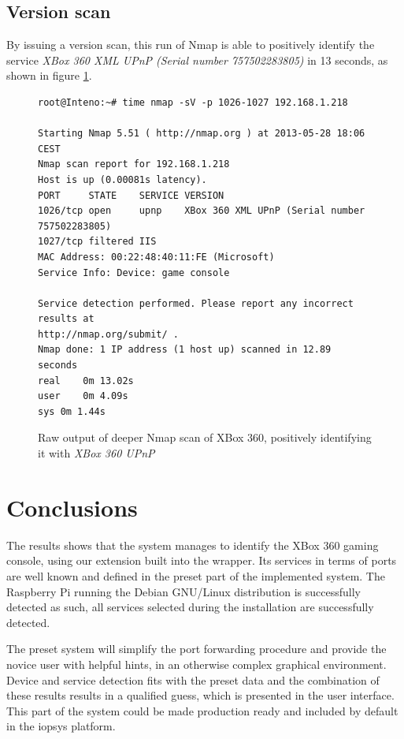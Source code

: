 \documentclass[a4paper,11pt]{kth-bcs}
\begin{document}
\section{Version scan}
By issuing a version scan, this run of Nmap is able to positively identify the service \emph{XBox 360 XML UPnP (Serial number 757502283805)} in 13 seconds, as shown in figure \ref{fig:nmapxbox}.
   \begin{figure}[ht]
      \centering
      \begin{verbatim}
root@Inteno:~# time nmap -sV -p 1026-1027 192.168.1.218

Starting Nmap 5.51 ( http://nmap.org ) at 2013-05-28 18:06 CEST
Nmap scan report for 192.168.1.218
Host is up (0.00081s latency).
PORT     STATE    SERVICE VERSION
1026/tcp open     upnp    XBox 360 XML UPnP (Serial number 757502283805)
1027/tcp filtered IIS
MAC Address: 00:22:48:40:11:FE (Microsoft)
Service Info: Device: game console

Service detection performed. Please report any incorrect results at
http://nmap.org/submit/ .
Nmap done: 1 IP address (1 host up) scanned in 12.89 seconds
real	0m 13.02s
user	0m 4.09s
sys	0m 1.44s
      \end{verbatim}
      \caption{
	 \small{
       Raw output of deeper Nmap scan of XBox 360, positively identifying it with \emph{XBox 360 UPnP}
	 }
      }
      \label{fig:nmapxbox}
   \end{figure}


\chapter{Conclusions}
The results shows that the system manages to identify the XBox 360 gaming console, using our extension built into the wrapper.
Its services in terms of ports are well known and defined in the preset part of the implemented system.
The Raspberry Pi running the Debian GNU/Linux distribution is successfully detected as such, all services selected during the installation are successfully detected.

The preset system will simplify the port forwarding procedure and provide the novice user with helpful hints, in an otherwise complex graphical environment.
Device and service detection fits with the preset data and the combination of these results results in a qualified guess, which is presented in the user interface.
This part of the system could be made production ready and included by default in the iopsys platform.
\end{document}
